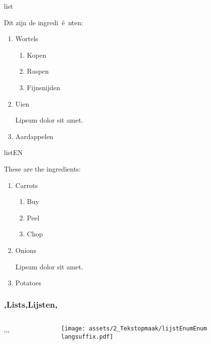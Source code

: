 \begin{saveblock}{list}
    \begin{highlightblock}[linewidth=0.5\textwidth,gobble=12]
        Dit zijn de ingredi~\"e~nten:
        \begin{enumerate}
            \item Wortels
            \begin{enumerate}
                \item Kopen
                \item Raspen
                \item Fijnsnijden
            \end{enumerate}			
            \item Uien
            
            Lipsum dolor sit amet.
            \item Aardappelen
        \end{enumerate}
    \end{highlightblock}
\end{saveblock}

\begin{saveblock}{listEN}
    \begin{highlightblock}[linewidth=0.5\textwidth,gobble=12]
        These are the ingredients:
        \begin{enumerate}
            \item Carrots
            \begin{enumerate}
                \item Buy
                \item Peel
                \item Chop
            \end{enumerate}			
            \item Onions
            
            Lipsum dolor sit amet.
            \item Potatoes
        \end{enumerate}
    \end{highlightblock}
\end{saveblock}

\begin{frame}
    \frametitle{\lang,Lists,Lijsten,}
    
    \begin{columns}
        \begin{column}{0.5\textwidth}
            \lang,,,
        \end{column}
        \begin{column}{0.5\textwidth}
            \texttt{[image: assets/2\_Tekstopmaak/lijstEnumEnum\\langsuffix.pdf]}
        \end{column}
    \end{columns}
\end{frame}

